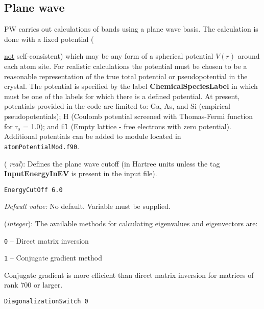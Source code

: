 
\subsection{Plane wave}


PW carries out calculations of bands using a plane wave basis. The
calculation is done with a fixed potential ({\underline{not}
self-consistent) which may be any form of a spherical potential
$V(r)$ around each atom site.  For realistic calculations the
potential must be chosen to be a reasonable representation of the
true total potential or pseudopotential in the crystal. The
potential is specified by the label {\bf ChemicalSpeciesLabel} in
which must be one of the labels for which there is a defined
potential. At present, potentials provided in the code are limited
to: Ga, As, and Si (empirical pseudopotentials); H (Coulomb
potential screened with Thomas-Fermi function for r$_s$ = 1.0);
and {\tt El} (Empty lattice - free electrons with zero potential).
Additional potentials can be added to module located in {\tt
atomPotentialMod.f90}.

\begin{description}
\itemsep 10pt
\parsep 0pt


 \item[{\bf EnergyCutoff}] ({\it
real}):  Defines the plane
wave cutoff (in Hartree units unless the tag {\bf InputEnergyInEV}
is present in the input file).

\begin{verbatim}
EnergyCutOff 6.0
\end{verbatim}

{\it Default value:} No default.  Variable must be supplied.

\item[{\bf DiagonalizationSwitch}] ({\it integer}):
The available methods for calculating eigenvalues and eigenvectors are:
\begin{description}
\item {\tt 0} -- Direct matrix inversion
\item {\tt 1} -- Conjugate gradient method
\end{description}
Conjugate gradient is more efficient than direct matrix inversion for
matrices of rank 700 or larger. 

\begin{verbatim}
DiagonalizationSwitch 0
\end{verbatim}


\end{description}}
